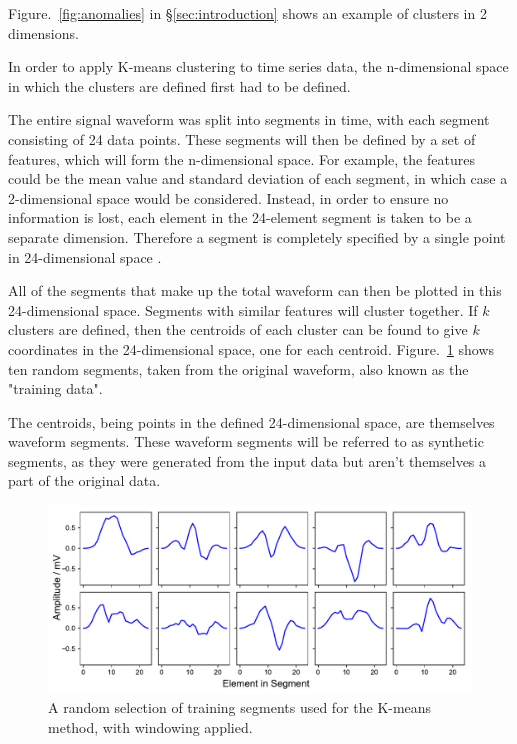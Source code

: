 Figure.~\ref{fig:anomalies} in \S \ref{sec:introduction} shows an example of clusters in 2 dimensions. 

In order to apply K-means clustering to time series data, the n-dimensional space in which the clusters are defined first had to be defined. 

The entire signal waveform was split into segments in time, with each segment consisting of 24 data points. These segments will then be defined by a set of features, which will form the n-dimensional space. For example, the features could be the mean value and standard deviation of each segment, in which case a 2-dimensional space would be considered. Instead, in order to ensure no information is lost, each element in the 24-element segment is taken to be a separate dimension. Therefore a segment is completely specified by a single point in 24-dimensional space \cite{lin_vlachos_keogh_gunopulos_2004}.

All of the segments that make up the total waveform can then be plotted in this 24-dimensional space. Segments with similar features will cluster together. If $k$ clusters are defined, then the centroids of each cluster can be found to give $k$ coordinates in the 24-dimensional space, one for each centroid. Figure.~\ref{fig:kmeans_training} shows ten random segments, taken from the original waveform, also known as the "training data".

The centroids, being points in the defined 24-dimensional space, are themselves waveform segments. These waveform segments will be referred to as synthetic segments, as they were generated from the input data but aren't themselves a part of the original data. 

\begin{figure}[t]
    \includegraphics[width=1.0\textwidth]{fig/kmeans_training.pdf}
    \caption[K-means training segments]{A random selection of training segments used for the K-means method, with windowing applied.}
    \label{fig:kmeans_training}
\end{figure}


